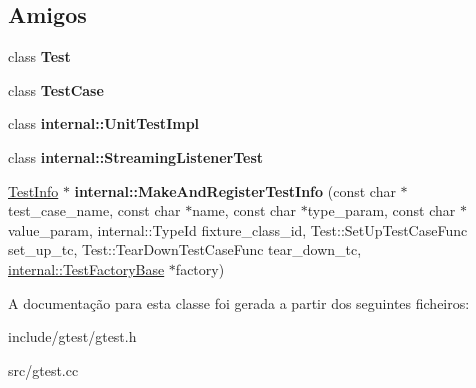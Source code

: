 \subsection*{Amigos}
\begin{DoxyCompactItemize}
\item 
\hypertarget{classtesting_1_1TestInfo_a5b78b1c2e1fa07ffed92da365593eaa4}{class {\bfseries Test}}\label{classtesting_1_1TestInfo_a5b78b1c2e1fa07ffed92da365593eaa4}

\item 
\hypertarget{classtesting_1_1TestInfo_aff779e55b06adfa7c0088bd10253f0f0}{class {\bfseries Test\-Case}}\label{classtesting_1_1TestInfo_aff779e55b06adfa7c0088bd10253f0f0}

\item 
\hypertarget{classtesting_1_1TestInfo_acc0a5e7573fd6ae7ad1878613bb86853}{class {\bfseries internal\-::\-Unit\-Test\-Impl}}\label{classtesting_1_1TestInfo_acc0a5e7573fd6ae7ad1878613bb86853}

\item 
\hypertarget{classtesting_1_1TestInfo_adc037d188dab349a94868991955c9cd4}{class {\bfseries internal\-::\-Streaming\-Listener\-Test}}\label{classtesting_1_1TestInfo_adc037d188dab349a94868991955c9cd4}

\item 
\hypertarget{classtesting_1_1TestInfo_a3e27fa5e97044d379b1e3b2a753f56f8}{\hyperlink{classtesting_1_1TestInfo}{Test\-Info} $\ast$ {\bfseries internal\-::\-Make\-And\-Register\-Test\-Info} (const char $\ast$test\-\_\-case\-\_\-name, const char $\ast$name, const char $\ast$type\-\_\-param, const char $\ast$value\-\_\-param, internal\-::\-Type\-Id fixture\-\_\-class\-\_\-id, Test\-::\-Set\-Up\-Test\-Case\-Func set\-\_\-up\-\_\-tc, Test\-::\-Tear\-Down\-Test\-Case\-Func tear\-\_\-down\-\_\-tc, \hyperlink{classtesting_1_1internal_1_1TestFactoryBase}{internal\-::\-Test\-Factory\-Base} $\ast$factory)}\label{classtesting_1_1TestInfo_a3e27fa5e97044d379b1e3b2a753f56f8}

\end{DoxyCompactItemize}


A documentação para esta classe foi gerada a partir dos seguintes ficheiros\-:\begin{DoxyCompactItemize}
\item 
include/gtest/gtest.\-h\item 
src/gtest.\-cc\end{DoxyCompactItemize}
